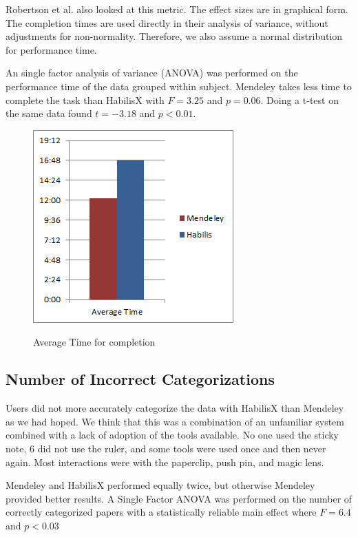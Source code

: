 \documentclass{article}
\begin{document}
Robertson et al.\cite{Robertson1998} also looked at this metric.  The effect sizes are in graphical form.  The completion times are used directly in their analysis of variance, without adjustments for non-normality.  Therefore, we also assume a normal distribution for performance time.


An single factor analysis of variance (ANOVA) was performed on the performance time of the data grouped within subject. Mendeley takes less time to complete the task than HabilisX with $F=3.25$ and $p = 0.06$.  Doing a t-test on the same data found $t=-3.18$ and $p<0.01$. 

\begin{figure}[h!]
\centering
\scalebox{1}
{\includegraphics{AverageTime.png}}
\caption{Average Time for completion}
\label{Fig:timeChart}
\end{figure}



\subsection*{Number of Incorrect Categorizations}

Users did not more accurately categorize the data with HabilisX than Mendeley as we had hoped.  We think that this was a combination of an unfamiliar system combined with a lack of adoption of the tools available.  No one used the sticky note, 6 did not use the ruler, and some tools were used once and then never again.  Most interactions were with the paperclip, push pin, and magic lens.    

Mendeley and HabilisX performed equally twice, but otherwise Mendeley provided better results.  A Single Factor ANOVA was performed on the number of correctly categorized papers with a statistically reliable main effect where $F=6.4$ and $p<0.03$
\end{document}
